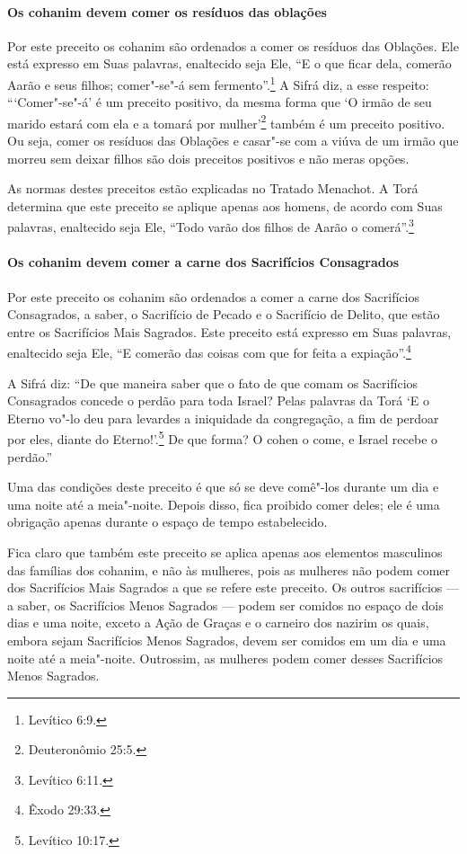 \begin{multicols}{2}
\paragraph{Os cohanim\starr{} devem comer os resíduos das oblações}

Por este preceito os cohanim\starr{} são ordenados a comer os resíduos das
Oblações. Ele está expresso em Suas palavras, enaltecido seja Ele, ``E o
que ficar dela, comerão Aarão e seus filhos; comer"-se"-á sem fermento''.\footnote{Levítico 6:9.} A Sifrá\starr{} diz, a esse respeito: ```Comer"-se"-á' é um
preceito positivo, da mesma forma que `O irmão de seu marido estará com
ela e a tomará por mulher'\footnote{Deuteronômio 25:5.} também é um preceito
positivo. Ou seja, comer os resíduos das Oblações e casar"-se com a viúva
de um irmão que morreu sem deixar filhos são dois preceitos positivos e
não meras opções.

As normas destes preceitos estão explicadas no Tratado Menachot\starr. A Torá\starr{}
determina que este preceito se aplique apenas aos homens, de acordo com
Suas palavras, enaltecido seja Ele, ``Todo varão dos filhos de Aarão o
comerá''.\footnote{Levítico 6:11.}

\paragraph{Os cohanim\starr{} devem comer a carne dos Sacrifícios Consagrados}

Por este preceito os cohanim\starr{} são ordenados a comer a carne dos
Sacrifícios Consagrados, a saber, o Sacrifício de Pecado e o Sacrifício
de Delito, que estão entre os Sacrifícios Mais Sagrados. Este preceito
está expresso em Suas palavras, enaltecido seja Ele, ``E comerão das
coisas com que for feita a expiação''.\footnote{Êxodo 29:33.}

A Sifrá\starr{} diz: ``De que maneira saber que o fato de que comam os
Sacrifícios Consagrados concede o perdão para toda Israel? Pelas
palavras da Torá\starr{} `E o Eterno vo"-lo deu para levardes a iniquidade da
congregação, a fim de perdoar por eles, diante do Eterno!'.\footnote{Levítico
10:17.} De que forma? O cohen\starr{} o come, e Israel recebe o perdão.''

Uma das condições deste preceito é que só se deve comê"-los durante um
dia e uma noite até a meia"-noite. Depois disso, fica proibido comer
deles; ele é uma obrigação apenas durante o espaço de tempo
estabelecido.

Fica claro que também este preceito se aplica apenas aos elementos
masculinos das famílias dos cohanim\starr, e não às mulheres, pois as
mulheres não podem comer dos Sacrifícios Mais Sagrados a que se refere
este preceito. Os outros sacrifícios --- a saber, os Sacrifícios Menos
Sagrados --- podem ser comidos no espaço de dois dias e uma noite,
exceto a Ação de Graças e o carneiro dos nazirim\starr{} os quais, embora sejam
Sacrifícios Menos Sagrados, devem ser comidos em um dia e uma noite até
a meia"-noite. Outrossim, as mulheres podem comer desses Sacrifícios
Menos Sagrados.


\end{multicols}

